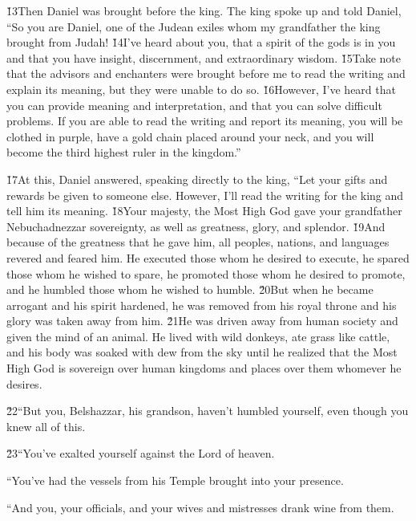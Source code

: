 \v{13}Then Daniel was brought before the king. The king spoke up and told Daniel, ``So you are Daniel, one of the Judean exiles whom my grandfather the king brought from Judah! \v{14}I've heard about you, that a spirit of the gods is in you and that you have insight, discernment, and extraordinary wisdom. \v{15}Take note that the advisors and enchanters were brought before me to read the writing and explain its meaning, but they were unable to do so. \v{16}However, I've heard that you can provide meaning and interpretation, and that you can solve difficult problems. If you are able to read the writing and report its meaning, you will be clothed in purple, have a gold chain placed around your neck, and you will become the third highest ruler in the kingdom.''

\v{17}At this, Daniel answered, speaking directly to the king, ``Let your gifts and rewards be given to someone else. However, I'll read the writing for the king and tell him its meaning. \v{18}Your majesty, the Most High God gave your grandfather Nebuchadnezzar sovereignty, as well as greatness, glory, and splendor. \v{19}And because of the greatness that he gave him, all peoples, nations, and languages revered and feared him. He executed those whom he desired to execute, he spared those whom he wished to spare, he promoted those whom he desired to promote, and he humbled those whom he wished to humble. \v{20}But when he became arrogant and his spirit hardened, he was removed from his royal throne and his glory was taken away from him. \v{21}He was driven away from human society and given the mind of an animal. He lived with wild donkeys, ate grass like cattle, and his body was soaked with dew from the sky until he realized that the Most High God is sovereign over human kingdoms and places over them whomever he desires.

\v{22}``But you, Belshazzar, his grandson, haven't humbled yourself, even though you knew all of this.

\v{23}``You've exalted yourself against the Lord of heaven.

``You've had the vessels from his Temple brought into your presence.

``And you, your officials, and your wives and mistresses drank wine from them.

